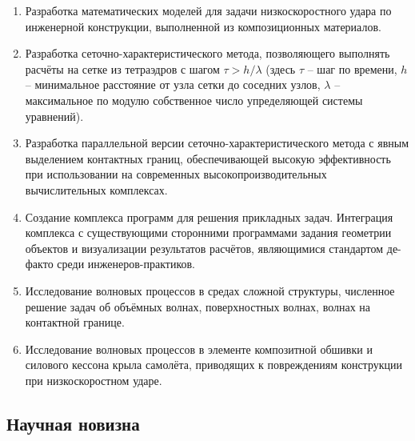 \begin{enumerate}
\item Разработка математических моделей для задачи низкоскоростного удара по инженерной конструкции, выполненной из композиционных материалов.
\item Разработка сеточно-характеристического метода, позволяющего выполнять расчёты на сетке из тетраэдров с шагом $\tau > h / \lambda$ (здесь $\tau$ -- шаг по времени, $h$ -- минимальное расстояние от узла сетки до соседних узлов, $\lambda$ -- максимальное по модулю собственное число упределяющей системы уравнений).
\item Разработка параллельной версии сеточно-характеристического метода с явным выделением контактных границ, обеспечивающей высокую эффективность при использовании на современных высокопроизводительных вычислительных комплексах.
\item Создание комплекса программ для решения прикладных задач. Интеграция комплекса с существующими сторонними программами задания геометрии объектов и визуализации результатов расчётов, являющимися стандартом де-факто среди инженеров-практиков.
\item Исследование волновых процессов в средах сложной структуры, численное решение задач об объёмных волнах, поверхностных волнах, волнах на контактной границе.
\item Исследование волновых процессов в элементе композитной обшивки и силового кессона крыла самолёта, приводящих к повреждениям конструкции при низкоскоростном ударе.
\end{enumerate}

\subsection*{Научная новизна}

